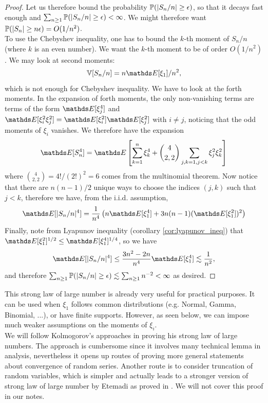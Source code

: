 \begin{proof}
Let us therefore bound the probability $\mathbb{P}(|S_n/n| \geq \epsilon)$, so that it decays fast enough and $\sum_{n\geq 1} \mathbb{P}(|S_n/n|\geq \epsilon) < \infty$. We might therefore want $\mathbb{P}(|S_n|\geq n\epsilon) = O(1/n^2)$. \\

To use the Chebyshev inequality, one has to bound the $k$-th moment of $S_n/n$ (where $k$ is an even number). We want the $k$-th moment to be of order $O(1/n^2)$. We may look at second moments:
\begin{equation}
\V[S_n/n] = n\E[\xi_1]/n^2,
\end{equation}
which is not enough for Chebyshev inequality. We have to look at the forth moments. In the expansion of forth moments, the only non-vanishing terms are terms of the form $\E[\xi_j^4]$ and $\E[\xi_i^2 \xi_j^2] = \E[\xi_i^2] \E[\xi_j^2]$ with $i \neq j$, noticing that the odd moments of $\xi_i$ vanishes. We therefore have the expansion
\begin{equation}
\E[S_n^4] = \E\sqbracket{\sum_{k=1}^n \xi_k^4 + {4 \choose 2, 2} \sum_{j,k=1, j < k} \xi_j^2 \xi_k^2}
\end{equation}
where ${4 \choose 2,2} = 4!/(2!)^2 = 6$ comes from the multinomial theorem. Now notice that there are $n(n-1)/2$ unique ways to choose the indices $(j,k)$ such that $j < k$, therefore we have, from the i.i.d. assumption,
\begin{equation}
\E[|S_n/n|^4] = \frac{1}{n^4} \bracket{n\E[\xi_1^4] + 3n(n-1) (\E[\xi_1^2])^2}
\end{equation}
Finally, note from Lyapunov inequality (corollary \ref{cor:lyapunov_ineq}) that $\E[\xi_1^2]^{1/2} \leq \E[\xi_1^4]^{1/4}$, so we have 
\begin{equation}
\E[|S_n/n|^4] \leq \frac{3n^2 - 2n}{n^4}\E[\xi_1^4] \lesssim \frac{1}{n^2},
\end{equation}
and therefore $\sum_{n\geq 1} \mathbb{P}(|S_n/n|\geq \epsilon) \lesssim \sum_{n\geq 1} n^{-2} < \infty$ as desired.
\end{proof}

This strong law of large number is already very useful for practical purposes. It can be used when $\xi_1$ follows common distributions (e.g. Normal, Gamma, Binomial, ...), or have finite supports. However, as seen below, we can impose much weaker assumptions on the moments of $\xi_i$. \\

We will follow Kolmogorov's approaches in proving his strong law of large numbers. The approach is cumbersome since it involves many technical lemma in analysis, nevertheless it opens up routes of proving more general statements about convergence of random series. Another route is to consider truncation of random variables, which is simpler and actually leads to a stronger version of strong law of large number by Etemadi as proved in \cite{EtemadiSLLN}. We will not cover this proof in our notes. \\

